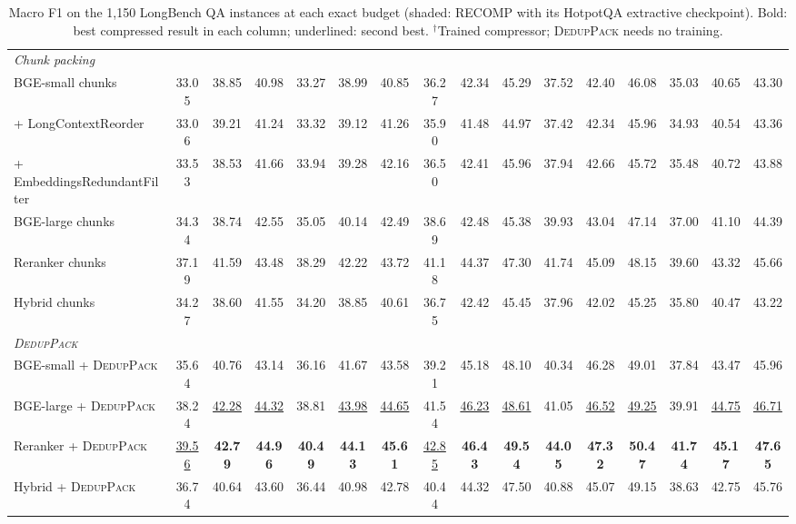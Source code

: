 \documentclass[11pt]{article}
\newcommand{\spk}{\textsc{DedupPack}}
\begin{document}
\begin{table}[h]
{\begin{tabular}{l ccc ccc ccc ccc ccc}
\midrule
\multicolumn{16}{l}{\textit{Chunk packing}} \\
BGE-small chunks & 33.05 & 38.85 & 40.98 & 33.27 & 38.99 & 40.85 & 36.27 & 42.34 & 45.29 & 37.52 & 42.40 & 46.08 & 35.03 & 40.65 & 43.30 \\
\quad + LongContextReorder & 33.06 & 39.21 & 41.24 & 33.32 & 39.12 & 41.26 & 35.90 & 41.48 & 44.97 & 37.42 & 42.34 & 45.96 & 34.93 & 40.54 & 43.36 \\
\quad + EmbeddingsRedundantFilter & 33.53 & 38.53 & 41.66 & 33.94 & 39.28 & 42.16 & 36.50 & 42.41 & 45.96 & 37.94 & 42.66 & 45.72 & 35.48 & 40.72 & 43.88 \\
BGE-large chunks & 34.34 & 38.74 & 42.55 & 35.05 & 40.14 & 42.49 & 38.69 & 42.48 & 45.38 & 39.93 & 43.04 & 47.14 & 37.00 & 41.10 & 44.39 \\
Reranker chunks & 37.19 & 41.59 & 43.48 & 38.29 & 42.22 & 43.72 & 41.18 & 44.37 & 47.30 & 41.74 & 45.09 & 48.15 & 39.60 & 43.32 & 45.66 \\
Hybrid chunks & 34.27 & 38.60 & 41.55 & 34.20 & 38.85 & 40.61 & 36.75 & 42.42 & 45.45 & 37.96 & 42.02 & 45.25 & 35.80 & 40.47 & 43.22 \\
\midrule
\multicolumn{16}{l}{\textit{\spk{}}} \\
BGE-small + \spk{} & 35.64 & 40.76 & 43.14 & 36.16 & 41.67 & 43.58 & 39.21 & 45.18 & 48.10 & 40.34 & 46.28 & 49.01 & 37.84 & 43.47 & 45.96 \\
BGE-large + \spk{} & 38.24 & \underline{42.28} & \underline{44.32} & 38.81 & \underline{43.98} & \underline{44.65} & 41.54 & \underline{46.23} & \underline{48.61} & 41.05 & \underline{46.52} & \underline{49.25} & 39.91 & \underline{44.75} & \underline{46.71} \\
Reranker + \spk{} & \underline{39.56} & \textbf{42.79} & \textbf{44.96} & \textbf{40.49} & \textbf{44.13} & \textbf{45.61} & \underline{42.85} & \textbf{46.43} & \textbf{49.54} & \textbf{44.05} & \textbf{47.32} & \textbf{50.47} & \textbf{41.74} & \textbf{45.17} & \textbf{47.65} \\
Hybrid + \spk{} & 36.74 & 40.64 & 43.60 & 36.44 & 40.98 & 42.78 & 40.44 & 44.32 & 47.50 & 40.88 & 45.07 & 49.15 & 38.63 & 42.75 & 45.76 \\
\bottomrule
\end{tabular}}
\caption*{\footnotesize Macro F1 on the 1,150 LongBench QA instances at each exact budget (shaded: RECOMP with its HotpotQA extractive checkpoint). Bold: best compressed result in each column; underlined: second best. $^\dagger$Trained compressor; \spk{} needs no training.}
\end{table}
\end{document}
